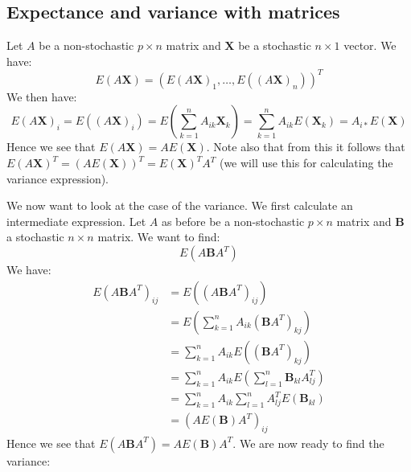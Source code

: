 \documentclass{article}
\begin{document}
\subsection{Expectance and variance with matrices}
Let $A$ be a non-stochastic $p \times n$ matrix and $\mathbf{X}$ be a stochastic
$n \times 1$ vector. We have:
$$E(A \mathbf{X}) = (E(A \mathbf{X})_1, \dots, E((A \mathbf{X})_n))^T$$
We then have:
$$E(A \mathbf{X})_i = E((A \mathbf{X})_i) = E(\sum_{k=1}^n A_{i k} \mathbf{X}_k) = \sum_{k=1}^n A_{i k} E(\mathbf{X}_k) = A_{i *} E(\mathbf{X})$$
Hence we see that $E(A \mathbf{X}) = A E(\mathbf{X})$.
Note also that from this it follows that $E(A \mathbf{X})^T = (A
    E(\mathbf{X}))^T = E(\mathbf{X})^T A^T$ (we will use this for calculating the
variance expression).

We now want to look at the case of the variance. We first calculate an
intermediate expression. Let $A$ as before be a non-stochastic $p \times n$
matrix and $\mathbf{B}$ a stochastic $n \times n$ matrix. We want to find:
$$E(A \mathbf{B} A^T)$$
We have:
\begin{align*}
    E(A \mathbf{B} A^T)_{i j} & = E((A \mathbf{B} A^T)_{i j})                                         \\
                              & = E(\sum_{k = 1}^n A_{i k} (\mathbf{B} A^T)_{k j})                    \\
                              & = \sum_{k = 1}^n A_{i k} E((\mathbf{B} A^T)_{k j})                    \\
                              & = \sum_{k = 1}^n A_{i k} E(\sum_{l=1}^{n} \mathbf{B}_{k l} A^T_{l j}) \\
                              & = \sum_{k = 1}^n A_{i k} \sum_{l=1}^{n} A^T_{l j} E(\mathbf{B}_{k l}) \\
                              & = (A E(\mathbf{B}) A^T)_{i j}
\end{align*}
Hence we see that $E(A \mathbf{B} A^T) = A E(\mathbf{B}) A^T$.  We are now ready
to find the variance:
\end{document}
